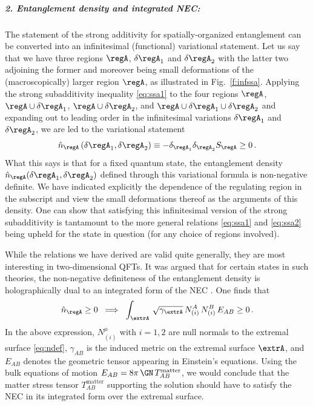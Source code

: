 \documentclass[12pt,openany]{book}
\begin{document}
\subparagraph{2. Entanglement density and integrated NEC:} The statement of the strong additivity for spatially-organized entanglement can be converted into an infinitesimal (functional) variational statement.  Let us say that we have three regions $\regA$, $\delta\regA_1$ and $\delta \regA_2$ with the latter two adjoining the former and moreover being small deformations of the (macroscopically) larger region $\regA$, as illustrated in Fig.~\ref{f:infssa}. Applying the strong subadditivity inequality  \eqref{eq:ssa1} to the four regions $\regA$, $\regA \cup \delta\regA_1$, $\regA \cup \delta \regA_2$, and
$\regA \cup \delta\regA_1 \cup\delta \regA_2$ and expanding out to leading order in the infinitesimal variations $\delta\regA_1$ and $\delta\regA_2$, we are led to the variational statement
%
\begin{equation}
\hat{n}_\regA\left(\delta\regA_1, \delta\regA_2\right) \equiv-\delta_{\regA_1} \delta_{\regA_2} S_\regA \geq 0\,.
\label{eq:eedensity}
\end{equation}
%
What this says is that for a fixed quantum state, the entanglement density $\hat{n}_\regA(\delta \regA_1, \delta \regA_2)$ defined through this variational formula is non-negative definite. We have indicated explicitly the dependence of the regulating region in the subscript and view the small deformations thereof as the arguments of this density.  One can show that satisfying this infinitesimal version of the strong subadditivity is tantamount to the more general relations \eqref{eq:ssa1} and \eqref{eq:ssa2} being upheld for the state in question (for any choice of regions involved).

While the relations we have derived are valid quite generally, they are most interesting in two-dimensional QFTs.  It was argued that for certain states in such theories, the non-negative definiteness of the entanglement density is holographically dual to an integrated form of the NEC \cite{Lashkari:2014kda,Bhattacharya:2014vja}. One finds that
%
\begin{equation}
\hat{n}_\regA \geq 0 \;\; \Longrightarrow \;\; \int_{\extrA} \, \sqrt{\gamma_{\extrA}} \, N^A_{(i)}\, N^B_{(i)} \,E_{AB} \geq 0 \,.
\label{}
\end{equation}
%
In the above expression, $N^\mu_{(i)}$ with $i=1,2$ are null normals to the extremal surface \eqref{eq:ndef}, $\gamma_{AB}$  is the induced metric on the extremal surface $\extrA$, and $E_{AB}$ denotes the geometric tensor appearing in Einstein's equations. Using the bulk equations of motion $E_{AB} = 8\pi\, \GN \, T_{AB}^\text{matter}$, we would conclude that the matter stress tensor $T_{AB}^\text{matter}$ supporting the solution should have to satisfy the NEC in its integrated form over the extremal surface.
\end{document}
